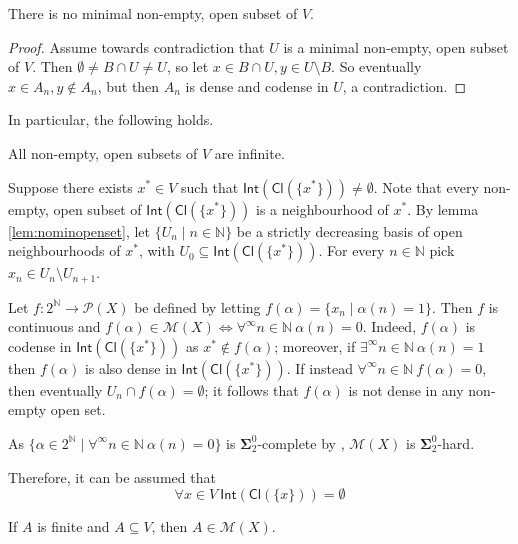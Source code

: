 \documentclass{lmcs}
\newcommand{\N}{\mathbb N}
\newcommand{\Can}{2^{\N}}
\newcommand{\bsigma}{\boldsymbol\Sigma}
\newcommand{\Cl}[1]{\mathsf{Cl}(#1)}
\newcommand{\Int}[1]{\mathsf{Int}(#1)}
\begin{document}
\begin{lem} \label{lem:nominopenset}
There is no minimal non-empty, open subset of $V$.
\end{lem}

\begin{proof}
Assume towards contradiction that $U$ is a minimal non-empty, open subset of $V$.
Then $\emptyset\ne B\cap U\ne U$, so let $x\in B\cap U,y\in U\setminus B$.
So eventually $x\in A_n,y\notin A_n$, but then $A_n$ is dense and codense in $U$, a contradiction.
\end{proof}

In particular, the following holds.

\begin{cor} \label{lem:openinfinite}
All non-empty, open subsets of $V$ are infinite.
\end{cor}

Suppose there exists $x^*\in V$ such that $ \Int{ \Cl{ \{ x^*\} } } \ne\emptyset $.
Note that every non-empty, open subset of $ \Int{ \Cl{ \{ x^*\} } } $ is a neighbourhood of $x^*$.
By lemma \ref{lem:nominopenset}, let $\{ U_n\mid n\in \N \} $ be a strictly decreasing basis of open neighbourhoods of $x^*$, with $U_0\subseteq \Int{ \Cl{ \{ x^*\} } } $.
For every $n\in \N $ pick $x_n\in U_n\setminus U_{n+1}$.

Let $f: \Can \to \mathcal P (X)$ be defined by letting $f(\alpha )=\{ x_n\mid\alpha (n)=1\} $.
Then $f$ is continuous and $f(\alpha )\in \mathcal M (X)\Leftrightarrow\forall^{\infty }n\in \N \ \alpha (n)=0$.
Indeed, $f(\alpha )$ is codense in $ \Int{ \Cl{ \{ x^*\} } } $ as $x^*\notin f(\alpha )$; moreover, if $\exists^{\infty }n\in \N \ \alpha (n)=1$ then $f(\alpha )$ is also dense in $ \Int{ \Cl{ \{ x^*\} } } $.
If instead $\forall^{\infty }n\in \N \ f(\alpha )=0$, then eventually $U_n\cap f(\alpha )=\emptyset $; it follows that $f(\alpha )$ is not dense in any non-empty open set.

As $\{\alpha\in \Can \mid\forall^{\infty }n\in \N \ \alpha (n)=0\} $ is $ \bsigma^0_2$-complete by \cite[\S 23.A]{Kechris1995}, $ \mathcal M (X)$ is $ \bsigma^0_2$-hard.

Therefore, it can be assumed that
\begin{equation} \label{eq:intemp}
\forall x\in V\ \Int{ \Cl{ \{ x\} } } =\emptyset
\end{equation}

\begin{lem} \label{lem:finsmot}
If $A$ is finite and $A\subseteq V$, then $A\in \mathcal M (X)$.
\end{lem}
\end{document}
